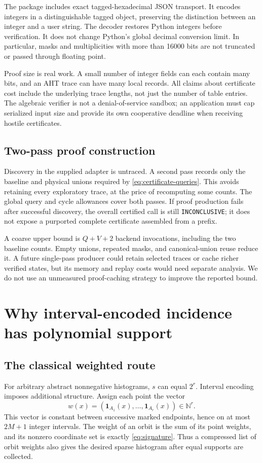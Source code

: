 \documentclass[11pt]{article}
\theoremstyle{definition}
\newcommand{\NN}{\mathbb{N}}
\newcommand{\ind}{\mathbf{1}}
\begin{document}
The package includes exact tagged-hexadecimal JSON transport. It encodes
integers in a distinguishable tagged object, preserving the distinction
between an integer and a user string. The decoder restores Python integers
before verification. It does not change Python's global decimal conversion
limit. In particular, masks and multiplicities with more than 16000 bits
are not truncated or passed through floating point.

Proof size is real work. A small number of integer fields can each contain
many bits, and an AHT trace can have many local records. All claims about
certificate cost include the underlying trace lengths, not just the number
of table entries. The algebraic verifier is not a denial-of-service
sandbox; an application must cap serialized input size and provide its
own cooperative deadline when receiving hostile certificates.

\subsection{Two-pass proof construction}
Discovery in the supplied adapter is untraced. A second pass records only
the baseline and physical unions required by \eqref{eq:certificate-queries}.
This avoids retaining every exploratory trace, at the price of recomputing
some counts. The global query and cycle allowances cover both passes. If
proof production fails after successful discovery, the overall certified
call is still \texttt{INCONCLUSIVE}; it does not expose a purported complete
certificate assembled from a prefix.

A coarse upper bound is $Q+V+2$ backend invocations, including the two
baseline counts. Empty unions, repeated masks, and canonical-union reuse
reduce it. A future single-pass producer could retain selected traces or
cache richer verified states, but its memory and replay costs would need
separate analysis. We do not use an unmeasured proof-caching strategy to
improve the reported bound.

\section{Why interval-encoded incidence has polynomial support}
\label{sec:support}

\subsection{The classical weighted route}
For arbitrary abstract nonnegative histograms, $s$ can equal $2^r$.
Interval encoding imposes additional structure. Assign each point the vector
\begin{equation}
 w(x)=(\ind_{A_1}(x),\ldots,\ind_{A_r}(x))\in\NN^r.
 \label{eq:indicator-weight}
\end{equation}
This vector is constant between successive marked endpoints, hence on at
most $2M+1$ integer intervals. The weight of an orbit is the sum of its point
weights, and its nonzero coordinate set is exactly \eqref{eq:signature}.
Thus a compressed list of orbit weights also gives the desired sparse
histogram after equal supports are collected.
\end{document}
